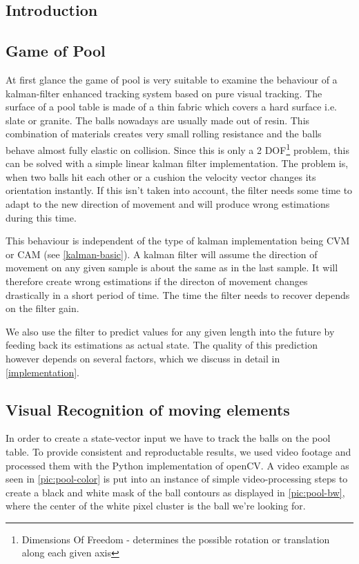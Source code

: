 \documentclass[notitlepage, a4paper, 11pt]{scrartcl}
\begin{document}
\begin{multicols}{2}
\section{Introduction}

\subsection{Game of Pool} \label{intro}

At first glance the game of pool is very suitable to examine the behaviour of a kalman-filter enhanced tracking system based on pure visual tracking. 
The surface of a pool table is made of a thin fabric which covers a hard surface i.e. slate or granite.
The balls nowadays are usually made out of resin. This combination of materials creates very small rolling resistance and the balls behave almost fully elastic on collision.
Since this is only a 2 DOF\footnote{Dimensions Of Freedom - determines the possible rotation or translation along each given axis} problem, this can be solved with a simple linear kalman filter implementation. 
The problem is, when two balls hit each other or a cushion the velocity vector changes its orientation instantly. 
If this isn't taken into account, the filter needs some time to adapt to the new direction of movement and will produce wrong estimations during this time.

This behaviour is independent of the type of kalman implementation being CVM or CAM (see \cref{kalman-basic}).
A kalman filter will assume the direction of movement on any given sample is about the same as in the last sample. 
It will therefore create wrong estimations if the directon of movement changes drastically in a short period of time. The time the filter needs to recover depends on the filter gain.

We also use the filter to predict values for any given length into the future by feeding back its estimations as actual state. 
The quality of this prediction however depends on several factors, which we discuss in detail in \cref{implementation}.

\subsection{Visual Recognition of moving elements}

In order to create a state-vector input we have to track the balls on the pool table. 
To provide consistent and reproductable results, we used video footage and processed them with the Python implementation of openCV.
A video example as seen in \cref{pic:pool-color} is put into an instance of simple video-processing steps to create a black and white mask of the ball contours as displayed in \cref{pic:pool-bw},
where the center of the white pixel cluster is the ball we're looking for.


\end{multicols}
\end{document}
